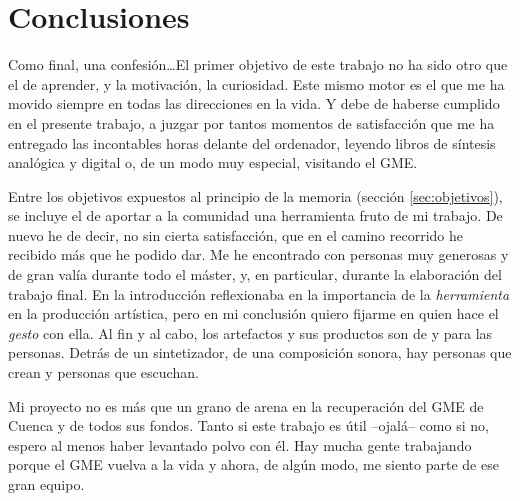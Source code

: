 \chapter[Conclusiones]{Conclusiones}


Como final, una confesión\dots El primer objetivo de este trabajo no ha sido otro que el de aprender, y la motivación, la curiosidad. Este mismo motor es el que me ha movido siempre en todas las direcciones en la vida. Y debe de haberse cumplido en el presente trabajo, a juzgar por tantos momentos de satisfacción que me ha entregado las incontables horas delante del ordenador, leyendo libros de síntesis analógica y digital o, de un modo muy especial, visitando el GME. 

Entre los objetivos expuestos al principio de la memoria (sección \ref{sec:objetivos}), se incluye el de aportar a la comunidad una herramienta fruto de mi trabajo. De nuevo he de decir, no sin cierta satisfacción, que en el camino recorrido he recibido más que he podido dar. Me he encontrado con personas muy generosas y de gran valía durante todo el máster, y, en particular, durante la elaboración del trabajo final. En la introducción reflexionaba en la importancia de la \textit{herramienta} en la producción artística, pero en mi conclusión quiero fijarme en quien hace el \textit{gesto} con ella. Al fin y al cabo, los artefactos y sus productos son de y para las personas. Detrás de un sintetizador, de una composición sonora, hay personas que crean y personas que escuchan.

Mi proyecto no es más que un grano de arena en la recuperación del GME de Cuenca y de todos sus fondos. Tanto si este trabajo es útil --ojalá-- como si no, espero al menos haber levantado polvo con él. Hay mucha gente trabajando porque el GME vuelva a la vida y ahora, de algún modo, me siento parte de ese gran equipo. 




